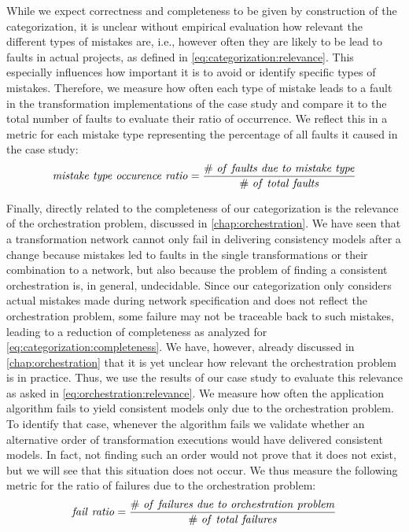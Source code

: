 While we expect correctness and completeness to be given by construction of the categorization, it is unclear without empirical evaluation how relevant the different types of mistakes are, i.e., however often they are likely to be lead to faults in actual projects, as defined in \autoref{eq:categorization:relevance}.
This especially influences how important it is to avoid or identify specific types of mistakes.
Therefore, we measure how often each type of mistake leads to a fault in the transformation implementations of the case study and compare it to the total number of faults to evaluate their ratio of occurrence.
We reflect this in a metric for each mistake type representing the percentage of all faults it caused in the case study:
\begin{align*}
    \mathvariable{mistake\ type\ occurence\ ratio} = \frac{\mathvariable{\#\ of\ faults\ due\ to\ mistake\ type}}{\mathvariable{\#\ of\ total\ faults}}
\end{align*}

Finally, directly related to the completeness of our categorization is the relevance of the orchestration problem, discussed in \autoref{chap:orchestration}.
We have seen that a transformation network cannot only fail in delivering consistency models after a change because mistakes led to faults in the single transformations or their combination to a network, but also because the problem of finding a consistent orchestration is, in general, undecidable.
Since our categorization only considers actual mistakes made during network specification and does not reflect the orchestration problem, some failure may not be traceable back to such mistakes, leading to a reduction of completeness as analyzed for \autoref{eq:categorization:completeness}.
We have, however, already discussed in \autoref{chap:orchestration} that it is yet unclear how relevant the orchestration problem is in practice.
Thus, we use the results of our case study to evaluate this relevance as asked in \autoref{eq:orchestration:relevance}.
We measure how often the application algorithm fails to yield consistent models only due to the orchestration problem.
To identify that case, whenever the algorithm fails we validate whether an alternative order of transformation executions would have delivered consistent models.
In fact, not finding such an order would not prove that it does not exist, but we will see that this situation does not occur.
We thus measure the following metric for the ratio of failures due to the orchestration problem:
\begin{align*}
    \mathvariable{fail\ ratio} = \frac{\mathvariable{\#\ of\ failures\ due\ to\ orchestration\ problem}}{\mathvariable{\#\ of\ total\ failures}}
\end{align*}


